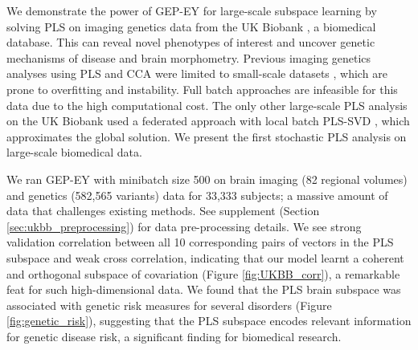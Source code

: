 We demonstrate the power of GEP-EY for large-scale subspace learning by solving PLS on imaging genetics data from the UK Biobank \cite{sudlow2015uk}, a biomedical database. This can reveal novel phenotypes of interest and uncover genetic mechanisms of disease and brain morphometry. Previous imaging genetics analyses using PLS and CCA were limited to small-scale datasets \cite{Lorenzi2018,Taquet2021,Lefloch2012}, which are prone to overfitting and instability. Full batch approaches are infeasible for this data due to the high computational cost. The only other large-scale PLS analysis on the UK Biobank used a federated approach with local batch PLS-SVD \cite{lorenzi2016}, which approximates the global solution. We present the first stochastic PLS analysis on large-scale biomedical data.

We ran GEP-EY with minibatch size 500 on brain imaging (82 regional volumes) and genetics (582,565 variants) data for 33,333 subjects; a massive amount of data that challenges existing methods. See supplement (Section \ref{sec:ukbb_preprocessing}) for data pre-processing details. We see strong validation correlation between all 10 corresponding pairs of vectors in the PLS subspace and weak cross correlation, indicating that our model learnt a coherent and orthogonal subspace of covariation (Figure \ref{fig:UKBB_corr}), a remarkable feat for such high-dimensional data. We found that the PLS brain subspace was associated with genetic risk measures for several disorders (Figure \ref{fig:genetic_risk}), suggesting that the PLS subspace encodes relevant information for genetic disease risk, a significant finding for biomedical research.


